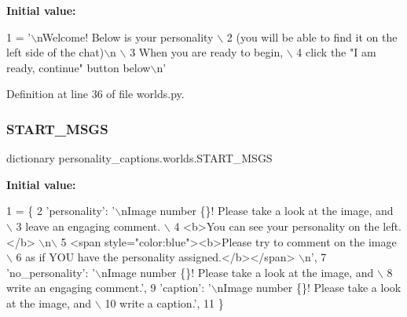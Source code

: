 {\bfseries Initial value\+:}
\begin{DoxyCode}
1 =  \textcolor{stringliteral}{'\(\backslash\)nWelcome! Below is your personality \(\backslash\)}
2 \textcolor{stringliteral}{        (you will be able to find it on the left side of the chat)\(\backslash\)n \(\backslash\)}
3 \textcolor{stringliteral}{        When you are ready to begin, \(\backslash\)}
4 \textcolor{stringliteral}{        click the "I am ready, continue" button below\(\backslash\)n'}
\end{DoxyCode}


Definition at line 36 of file worlds.\+py.

\mbox{\label{namespacepersonality__captions_1_1worlds_ae252c0c2ec5ecf39c1e79ff1b7736c93}} 
\subsubsection{\texorpdfstring{S\+T\+A\+R\+T\+\_\+\+M\+S\+GS}{START\_MSGS}}
{\footnotesize\ttfamily dictionary personality\+\_\+captions.\+worlds.\+S\+T\+A\+R\+T\+\_\+\+M\+S\+GS}

{\bfseries Initial value\+:}
\begin{DoxyCode}
1 =  \{
2     \textcolor{stringliteral}{'personality'}: \textcolor{stringliteral}{'\(\backslash\)nImage number \{\}! Please take a look at the image, and \(\backslash\)}
3 \textcolor{stringliteral}{            leave an engaging comment. \(\backslash\)}
4 \textcolor{stringliteral}{            <b>You can see your personality on the left.</b> \(\backslash\)n\(\backslash\)}
5 \textcolor{stringliteral}{            <span style="color:blue"><b>Please try to comment on the image \(\backslash\)}
6 \textcolor{stringliteral}{            as if YOU have the personality assigned.</b></span> \(\backslash\)n'},
7     \textcolor{stringliteral}{'no\_personality'}: \textcolor{stringliteral}{'\(\backslash\)nImage number \{\}! Please take a look at the image, and \(\backslash\)}
8 \textcolor{stringliteral}{                       write an engaging comment.'},
9     \textcolor{stringliteral}{'caption'}: \textcolor{stringliteral}{'\(\backslash\)nImage number \{\}! Please take a look at the image, and \(\backslash\)}
10 \textcolor{stringliteral}{                write a caption.'},
11 \}
\end{DoxyCode}


